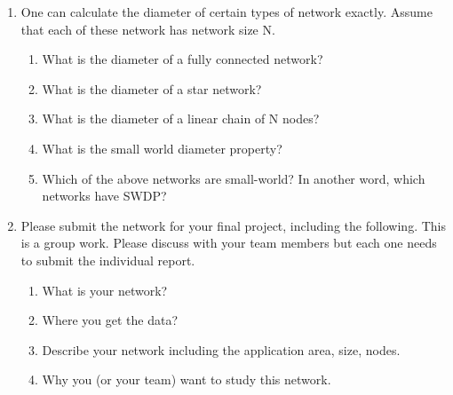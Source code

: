 \documentclass{amsart}
\theoremstyle{definition}
\theoremstyle{remark}
\numberwithin{equation}{section}
\begin{document}
\begin{enumerate}
\vspace{3cm}

\item One can calculate the diameter of certain types of network exactly. Assume that each of these network has network size N.
\begin{enumerate}
\item What is the diameter of a fully connected network?\vspace{1cm}
\item What is the diameter of a star network?\vspace{1cm}
\item What is the diameter of a linear chain of N nodes? \vspace{1cm}
\item What is the small world diameter property? \vspace{1cm}
\item Which of the above networks are small-world? In another word, which networks have SWDP?
\end{enumerate}
\clearpage

\item Please submit the network for your final project, including the following. This is a group work. Please discuss with your team members but each one needs to submit the individual report. 
\begin{enumerate}
\item What is your network?\vspace{1cm}
\item Where you get the data?\vspace{1cm}
\item Describe your network including the application area, size, nodes.\vspace{1cm}
\item Why you (or your team) want to study this network. 
\end{enumerate}

\end{enumerate}
\end{document}
